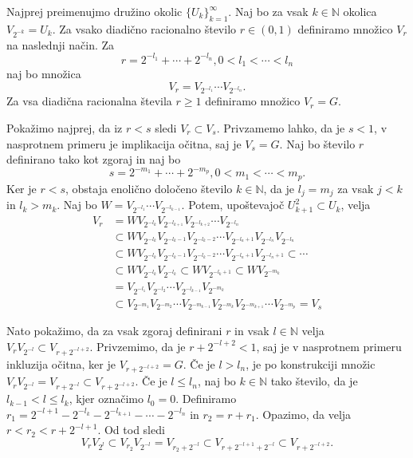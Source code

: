 \documentclass[mat1]{fmfdelo}
\newcommand{\N}{\mathbb N}
\begin{document}
\begin{dokaz}
Najprej preimenujmo družino okolic $\lbrace U_k \rbrace_{k = 1}^\infty$. Naj bo za vsak $k \in \N$ okolica $V_{2^{-k}} = U_k$. Za vsako diadično racionalno število $r \in (0, 1)$ definiramo množico $V_r$ na naslednji način. Za
\[ r = 2^{-l_1} + \cdots + 2^{-l_n}, 0 < l_1 < \cdots < l_n \]
naj bo množica
\[ V_r = V_{2^{-l_1}}\cdots V_{2^{-l_n}}. \]
Za vsa diadična racionalna števila $r \geq 1$ definiramo množico $V_r = G$.

Pokažimo najprej, da iz $r < s$ sledi $V_r \subset V_s$. Privzamemo lahko, da je $s < 1$, v nasprotnem primeru je implikacija očitna, saj je $V_s = G$.
Naj bo število $r$ definirano tako kot zgoraj in naj bo
\[ s = 2^{-m_1} + \cdots + 2^{-m_p}, 0 < m_1 < \cdots < m_p. \]
Ker je $r < s$, obstaja enolično določeno število $k \in \N$, da je $l_j = m_j$ za vsak $j < k$ in $l_k > m_k$. Naj bo $W = V_{2^{-l_1}}\cdots V_{2^{-l_{k-1}}}$.
Potem, upoštevajoč $U_{k+1}^2 \subset U_k$, velja
\begin{align*}
V_r &= WV_{2^{-l_k}}V_{2^{-l_{k+1}}}V_{2^{-l_{k+2}}}\cdots V_{2^{-l_n}} \\
&\subset WV_{2^{-l_k}}V_{2^{-l_k-1}}V_{2^{-l_k-2}}\cdots V_{2^{-l_n+1}}V_{2^{-l_n}}V_{2^{-l_n}} \\
&\subset WV_{2^{-l_k}}V_{2^{-l_k-1}}V_{2^{-l_k-2}}\cdots V_{2^{-l_n+1}}V_{2^{-l_n+1}} \subset \cdots \\
&\subset WV_{2^{-l_k}}V_{2^{-l_k}} \subset WV_{2^{-l_k+1}} \subset WV_{2^{-m_k}} \\
&= V_{2^{-l_1}}V_{2^{-l_2}}\cdots V_{2^{-l_{k-1}}}V_{2^{-m_k}} \\
&\subset V_{2^{-m_1}}V_{2^{-m_2}}\cdots V_{2^{-m_{k-1}}}V_{2^{-m_k}}V_{2^{-m_{k+1}}}\cdots V_{2^{-m_p}} = V_s
\end{align*}

Nato pokažimo, da za vsak zgoraj definirani $r$ in vsak $l \in \N$ velja $V_rV_{2^{-l}} \subset V_{r + 2^{-l+2}}$. Privzemimo, da je $r + 2^{-l+2} < 1$, saj je v nasprotnem primeru inkluzija očitna, ker je $V_{r + 2^{-l+2}} = G$.
Če je $l > l_n$, je po konstrukciji množic $V_rV_{2^{-l}} = V_{r + 2^{-l}} \subset V_{r + 2^{-l+2}}$. Če je $l \leq l_n$, naj bo $k \in \N$ tako število, da je $l_{k-1} < l \leq l_k$, kjer označimo $l_0 = 0$. Definiramo $r_1 = 2^{-l+1} - 2^{-l_k} - 2^{-l_{k+1}} - \cdots - 2^{-l_n}$ in $r_2 = r + r_1$. Opazimo, da velja $r < r_2 < r + 2^{-l+1}$. Od tod sledi
\[ V_rV_{2^{l}} \subset V_{r_2}V_{2^{-l}} = V_{r_2 + 2^{-l}} \subset V_{r + 2^{-l+1} + 2^{-l}} \subset V_{r + 2^{-l+2}}. \]


\end{dokaz}
\end{document}
